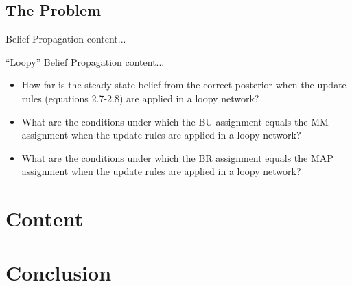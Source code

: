 \documentclass{beamer}
\begin{document}
\subsection{The Problem}
\begin{frame}{Belief Propagation}
    content...
\end{frame}
\begin{frame}{``Loopy'' Belief Propagation}
    content...
\end{frame}
\begin{frame}
    \begin{itemize}
        \item How far is the steady-state belief from the correct posterior when the update rules (equations 2.7-2.8) are applied in a loopy network?
        \item What are the conditions under which the BU assignment equals the MM assignment when the update rules are applied in a loopy network?
        \item What are the conditions under which the BR assignment equals the MAP assignment when the update rules are applied in a loopy network?
    \end{itemize}
\end{frame}
\section{Content}
\begin{frame}
\end{frame}
\section{Conclusion}
\begin{frame}
\end{frame}
\end{document}
